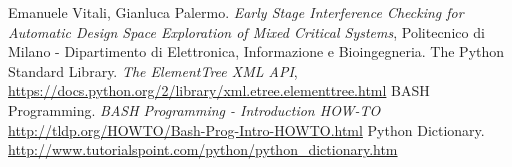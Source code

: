 \begin{thebibliography}{4}
    Emanuele Vitali, Gianluca Palermo.
    \emph{Early Stage Interference Checking for Automatic Design Space Exploration of Mixed Critical Systems},
    Politecnico di Milano - Dipartimento di Elettronica, Informazione e Bioingegneria.
    The Python Standard Library.
    \emph{The ElementTree XML API},
    \url{https://docs.python.org/2/library/xml.etree.elementtree.html}
    BASH Programming.
    \emph{BASH Programming - Introduction HOW-TO}
    \url{http://tldp.org/HOWTO/Bash-Prog-Intro-HOWTO.html}
    Python Dictionary.
    \url{http://www.tutorialspoint.com/python/python_dictionary.htm}
\end{thebibliography}
